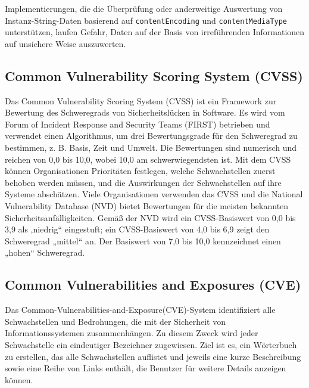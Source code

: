 Implementierungen, die die Überprüfung oder anderweitige Auswertung von Instanz-String-Daten basierend auf \texttt{contentEncoding} und \texttt{contentMediaType} unterstützen, laufen Gefahr, Daten auf der Basis von irreführenden Informationen auf unsichere Weise auszuwerten\cite{jsonsecurityproblems18}.

\subsection{Common Vulnerability Scoring System (CVSS)}

Das Common Vulnerability Scoring System (CVSS) ist ein Framework zur Bewertung des Schweregrads von Sicherheitslücken in Software. Es wird vom Forum of Incident Response and Security Teams (FIRST) betrieben und verwendet einen Algorithmus, um drei Bewertungsgrade für den Schweregrad zu bestimmen, z. B. Basis, Zeit und Umwelt. Die Bewertungen sind numerisch und reichen von 0,0 bis 10,0, wobei 10,0 am schwerwiegendsten ist. Mit dem CVSS können Organisationen Prioritäten festlegen, welche Schwachstellen zuerst behoben werden müssen, und die Auswirkungen der Schwachstellen auf ihre Systeme abschätzen. Viele Organisationen verwenden das CVSS und die National Vulnerability Database (NVD) bietet Bewertungen für die meisten bekannten Sicherheitsanfälligkeiten. Gemäß der NVD wird ein CVSS-Basiswert von 0,0 bis 3,9 als ‚niedrig“ eingestuft; ein CVSS-Basiswert von 4,0 bis 6,9 zeigt den Schweregrad „mittel“ an. Der Basiswert von 7,0 bis 10,0 kennzeichnet einen „hohen“ Schweregrad\cite{cvss16}.\\

\subsection{Common Vulnerabilities and Exposures (CVE)}

Das Common-Vulnerabilities-and-Exposure(CVE)-System identifiziert alle Schwachstellen und Bedrohungen, die mit der Sicherheit von Informationssystemen zusammenhängen. Zu diesem Zweck wird jeder Schwachstelle ein eindeutiger Bezeichner zugewiesen. Ziel ist es, ein Wörterbuch zu erstellen, das alle Schwachstellen auflistet und jeweils eine kurze Beschreibung sowie eine Reihe von Links enthält, die Benutzer für weitere Details anzeigen können\cite{cve18}.\\
















